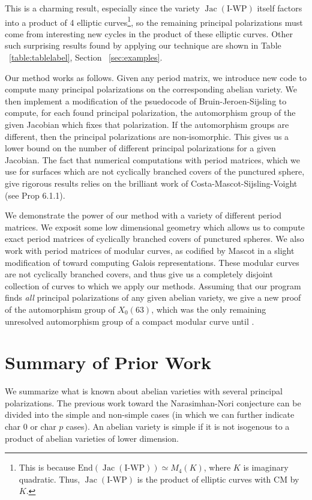 \documentclass[12pt,reqno]{amsart}
\DeclareMathOperator{\Jac}{Jac}
\theoremstyle{definition}
\theoremstyle{remark}
\begin{document}
This is a charming result, especially since the variety $\Jac(\text{I-WP})$ itself factors into a product of 4 elliptic curves\footnote{This is because $\text{End}(\Jac(\text{I-WP})) \simeq M_4(K)$, where $K$ is imaginary quadratic. Thus, $\Jac(\text{I-WP})$ is the product of elliptic curves with CM by $K$.}, so the remaining principal polarizations must come from interesting new cycles in the product of these elliptic curves. Other such surprising results found by applying our technique are shown in Table ~\ref{table:tablelabel}, Section ~\ref{sec:examples}.

Our method works as follows. Given any period matrix, we introduce new code to compute many principal polarizations on the corresponding abelian variety. We then implement a modification of the psuedocode of Bruin-Jeroen-Sijsling \cite{numerical} to compute, for each found principal polarization, the automorphism group of the given Jacobian which fixes that polarization. If the automorphism groups are different, then the principal polarizations are non-isomorphic. This gives us a lower bound on the number of different principal polarizations for a given Jacobian. The fact that numerical computations with period matrices, which we use for surfaces which are not cyclically branched covers of the punctured sphere, give rigorous results relies on the brilliant work of Costa-Mascot-Sijsling-Voight \cite{rigor} (see Prop 6.1.1).

We demonstrate the power of our method with a variety of different period matrices. We exposit some low dimensional geometry which allows us to compute exact period matrices of cyclically branched covers of punctured spheres. We also work with period matrices of modular curves, as codified by Mascot in a slight modification of \cite{n} toward computing Galois representations. These modular curves are not cyclically branched covers, and thus give us a completely disjoint collection of curves to which we apply our methods. Assuming that our program finds \textit{all} principal polarizations of any given abelian variety, we give a new proof of the automorphism group of $X_0(63)$, which was the only remaining unresolved automorphism group of a compact modular curve until \cite{elkies}.  

\section{Summary of Prior Work}

We summarize what is known about abelian varieties with several principal polarizations. The previous work toward the Narasimhan-Nori conjecture can be divided into the simple and non-simple cases (in which we can further indicate char 0 or char $p$ cases). An abelian variety is simple if it is not isogenous to a product of abelian varieties of lower dimension. 
\end{document}
